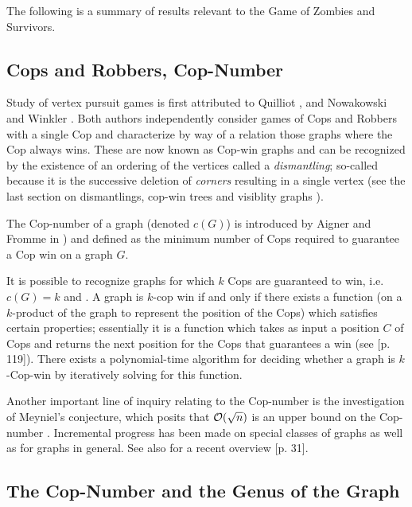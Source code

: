 The following is a summary of results relevant to the Game of Zombies and Survivors.

\subsection{Cops and Robbers, Cop-Number}

Study of vertex pursuit games is first attributed to Quilliot \cite{quilliot1978jeux, quilliot1983problemes}, and Nowakowski and Winkler \cite{nowakowski1983vertex}.
Both authors independently consider games of Cops and Robbers with a single Cop and characterize by way of a relation those graphs where the Cop always wins. These are now known as Cop-win graphs
and can be recognized by the existence of an ordering of the vertices called a \textit{dismantling};
so-called because it is the successive deletion of \textit{corners} resulting in a single vertex
(see the last section on dismantlings, cop-win trees and visiblity graphs ).

The Cop-number of a graph (denoted $c(G)$) is introduced by Aigner and Fromme in \cite{aigner1984game}) and defined as the minimum number of Cops required
to guarantee a Cop win on a graph $G$.

It is possible to recognize graphs for which $k$ Cops are guaranteed to win, i.e. $c(G) = k$ \cite{berarducci1993cop} and \cite{hahn2003characterisation}.
A graph is $k$-cop win if and only if there
exists a function (on a $k$-product of the graph to represent the position of the Cops)
which satisfies certain properties; essentially it is a function which takes as input a position $C$ of Cops
and returns the next position for the Cops that guarantees a win (see \cite{bonato2011game}[p. 119]).
There exists a polynomial-time algorithm for deciding whether a graph is $k$-Cop-win by iteratively
solving for this function.

Another important line of inquiry relating to the Cop-number is the investigation of Meyniel's conjecture, which posits that $\mathcal{O}(\sqrt{n})$ is an upper bound on the Cop-number \cite{frankl1987cops}.
Incremental progress has been made on special classes of graphs as well as for graphs in general. See also for a recent
overview \cite{gera2016graph}[p. 31].

\subsection{The Cop-Number and the Genus of the Graph}

